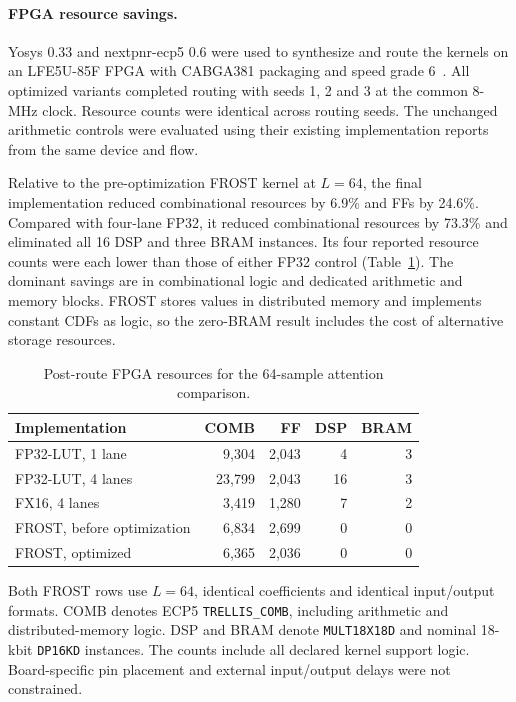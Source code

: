\paragraph{FPGA resource savings.}
Yosys 0.33 and nextpnr-ecp5 0.6 were used to synthesize and route the
kernels on an LFE5U-85F FPGA with CABGA381 packaging and speed
grade 6~\cite{yosysSoftware,nextpnrSoftware}. All optimized variants
completed routing with seeds 1, 2 and 3 at the common 8-MHz clock.
Resource counts were identical across routing seeds. The unchanged
arithmetic controls were evaluated using their existing implementation
reports from the same device and flow.

Relative to the pre-optimization FROST kernel at $L=64$, the final
implementation reduced combinational resources by 6.9\% and FFs by
24.6\%. Compared with four-lane FP32, it reduced combinational resources
by 73.3\% and eliminated all 16 DSP and three BRAM instances.
Its four reported resource counts were each lower than those of
either FP32 control (Table~\ref{tab:fused_fpga_resources}).
The dominant savings are in combinational logic and dedicated
arithmetic and memory blocks.
FROST stores values in distributed memory and implements constant CDFs
as logic, so the zero-BRAM result includes the cost of alternative
storage resources.

\begin{table}[!htbp]
\centering
\caption{Post-route FPGA resources for the 64-sample attention comparison.}
\label{tab:fused_fpga_resources}
\small
\setlength{\tabcolsep}{4pt}
\begin{tabular*}{\linewidth}{@{\extracolsep{\fill}}lrrrr@{}}
\toprule
Implementation & COMB & FF & DSP & BRAM \\
\midrule
FP32-LUT, 1 lane & 9,304 & 2,043 & 4 & 3 \\
FP32-LUT, 4 lanes & 23,799 & 2,043 & 16 & 3 \\
FX16, 4 lanes & 3,419 & 1,280 & 7 & 2 \\
FROST, before optimization & 6,834 & 2,699 & 0 & 0 \\
FROST, optimized & 6,365 & 2,036 & 0 & 0 \\
\bottomrule
\end{tabular*}
\par\smallskip\footnotesize
Both FROST rows use $L=64$, identical coefficients and identical
input/output formats. COMB denotes ECP5 \texttt{TRELLIS\_COMB}, including
arithmetic and distributed-memory logic. DSP and BRAM denote
\texttt{MULT18X18D} and nominal 18-kbit \texttt{DP16KD} instances.
The counts include all declared kernel support logic. Board-specific
pin placement and external input/output delays were not constrained.
\end{table}

